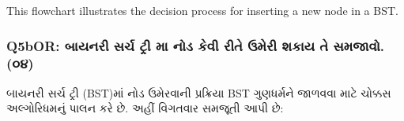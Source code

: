 \begin{Shaded}
\begin{Highlighting}[]
\end{Highlighting}
\end{Shaded}

This flowchart illustrates the decision process for inserting a new node
in a BST.

\hypertarget{q5bor-uxaacuxaafuxaa8uxab0-uxab8uxab0uxa9a-uxa9fuxab0-uxaae-uxaa8uxaa1-uxa95uxab5-uxab0uxaa4-uxa89uxaaeuxab0-uxab6uxa95uxaaf-uxaa4-uxab8uxaaeuxa9cuxab5.-uxae6uxaea}{%
\subsubsection{Q5bOR: બાયનરી સર્ચ ટ્રી મા નોડ કેવી રીતે ઉમેરી શકાય તે સમજાવો.
(૦૪)}\label{q5bor-uxaacuxaafuxaa8uxab0-uxab8uxab0uxa9a-uxa9fuxab0-uxaae-uxaa8uxaa1-uxa95uxab5-uxab0uxaa4-uxa89uxaaeuxab0-uxab6uxa95uxaaf-uxaa4-uxab8uxaaeuxa9cuxab5.-uxae6uxaea}}

બાયનરી સર્ચ ટ્રી (BST)માં નોડ ઉમેરવાની પ્રક્રિયા BST ગુણધર્મને જાળવવા માટે ચોક્કસ
અલ્ગોરિધમનું પાલન કરે છે. અહીં વિગતવાર સમજૂતી આપી છે:

